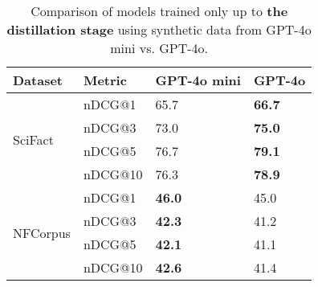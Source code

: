 \begin{table}[t!]
\centering
    \begin{adjustbox}{width=.37\textwidth,center}
    \begin{tabular}{l|l|l|l}
\hline
\textbf{Dataset}          & \textbf{Metric} & \textbf{GPT-4o mini} & \textbf{GPT-4o} \\ \hline
\multirow{4}{*}{SciFact} & nDCG@1          &    65.7                                &      \textbf{66.7}                         \\
                          & nDCG@3          &   73.0                                 &        \textbf{75.0}                       \\ 
                          & nDCG@5          &   76.7                                &        \textbf{79.1}                      \\ 
                          & nDCG@10         &   76.3                                &         \textbf{78.9}                       \\ \hline
\multirow{4}{*}{NFCorpus}     & nDCG@1          &                         \textbf{46.0}      &        45.0    \\ 
                          & nDCG@3          &        \textbf{42.3}                            &        41.2    \\ 
                          & nDCG@5          &        \textbf{42.1}                            &        41.1    \\  
                          & nDCG@10         &        \textbf{42.6}                            &        41.4    \\ \hline
\end{tabular}
\end{adjustbox}
\caption{Comparison of models  trained only up to \textbf{the distillation stage} using synthetic data from GPT-4o mini vs. GPT-4o.}
\label{tab:ablation_llm_stage1}
\end{table}

